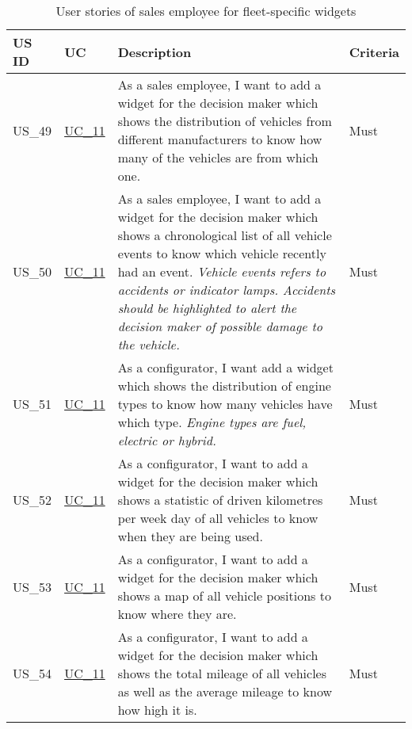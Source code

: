   \label{FlottenWidgets}
  \sffamily
  \begin{footnotesize}
    \begin{longtable}[L L L L ]{ p{} p{} p{} p{}}
      \caption                       %
          {User stories of sales employee for fleet-specific widgets} %
          \\
      \toprule
      \textbf{US ID} & \textbf{UC} & \textbf{Description} & \textbf{Criteria} \\
      \midrule
      \hypertarget{Ref:US49}{US\_49} & \hyperlink{Ref:UC11}{UC\_11} & As a sales employee, I want to add a widget for the decision maker which shows the distribution of vehicles from different manufacturers to know how many of the vehicles are from which one. & Must  \\
      \hypertarget{Ref:US50}{US\_50} & \hyperlink{Ref:UC11}{UC\_11} & As a sales employee, I want to add a widget for the decision maker which shows a chronological list of all vehicle events to know which vehicle recently had an event.
      \newline\newline
      \emph{Vehicle events refers to accidents or indicator lamps. Accidents should be highlighted to alert the decision maker of possible damage to the vehicle.} & Must \\
      \hypertarget{Ref:US51}{US\_51} & \hyperlink{Ref:UC11}{UC\_11} & As a configurator, I want add a widget which shows the distribution of engine types to know how many vehicles have which type. 
      \newline\newline
      \emph{Engine types are fuel, electric or hybrid.} & Must \\
      \hypertarget{Ref:US52}{US\_52} & \hyperlink{Ref:UC11}{UC\_11} & As a configurator, I want to add a widget for the decision maker which shows a statistic of driven kilometres per week day of all vehicles to know when they are being used. & Must \\
      \hypertarget{Ref:US53}{US\_53} & \hyperlink{Ref:UC11}{UC\_11} & As a configurator, I want to add a widget for the decision maker which shows a map of all vehicle positions to know where they are. & Must \\
      \hypertarget{Ref:US54}{US\_54} & \hyperlink{Ref:UC11}{UC\_11} & As a configurator, I want to add a widget for the decision maker which shows the total mileage of all vehicles as well as the average mileage to know how high it is. & Must \\
      \bottomrule
    \end{longtable}
  \end{footnotesize}
  \rmfamily

